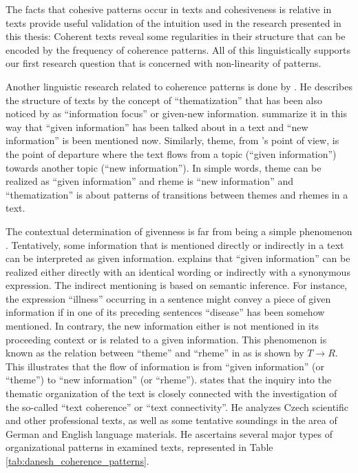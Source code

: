 The facts that cohesive patterns occur in texts and cohesiveness is relative in texts provide useful validation of the intuition used in the research presented in this thesis: Coherent texts reveal some regularities in their structure that can be encoded by the frequency of coherence patterns. 
All of this linguistically supports our first research question that is concerned with \mbox{non-linearity} of patterns. 

Another linguistic research related to coherence patterns is done by . 
He describes the structure of texts by the concept  of ``thematization'' that has been also noticed by  as ``information focus'' or \mbox{given-new} information. 
 summarize it in this way that ``given information'' has been talked about in a text and ``new information'' is been mentioned now.  
Similarly, theme, from 's point of view, is the point of departure where the text flows from a topic (``given information'') towards another topic (``new information''). 
In simple words, theme can be realized as ``given information'' and rheme is ``new information'' and ``thematization'' is about patterns of transitions between themes and rhemes in a text. 

The contextual determination of givenness is far from being a simple phenomenon \cite{danes74a}. 
Tentatively, some information that is mentioned directly or indirectly in a text can be interpreted as given information. 
 explains that ``given information'' can be realized either directly with an identical wording or indirectly with a synonymous expression.  
The indirect mentioning is based on semantic inference. 
For instance, the expression ``illness'' occurring in a sentence might convey a piece of given information if in one of its preceding sentences ``disease'' has been somehow mentioned. 
In contrary, the new information either is not mentioned in its proceeding context or is related to a given information. 
This phenomenon is known as the relation between ``theme'' and ``rheme'' in  as is shown by  $T \rightarrow R$. 
This illustrates that the flow of information is from ``given information'' (or ``theme'') to ``new information'' (or ``rheme'').
 states that the inquiry into the thematic organization of the text is closely connected with the investigation of the so-called ``text coherence'' or ``text connectivity''.
He analyzes Czech scientific and other professional texts, as well as some tentative soundings in the area of German and English language materials.
He ascertains several major types of organizational patterns in examined texts, represented in Table \ref{tab:danesh_coherence_patterns}. 


